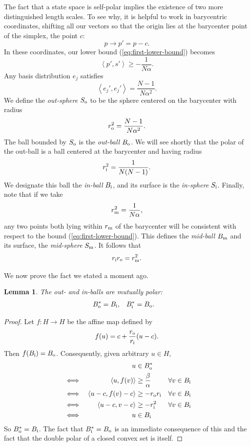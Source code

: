 \documentclass[aps,pra,superscriptaddress,10pt,tightenlines,twocolumn,nofootinbib]{revtex4}
\newtheorem{lemma}[theorem]{Lemma}
\theoremstyle{remark}
\newcommand{\be}{\begin{equation}}
\newcommand{\ee}{\end{equation}}
\newcommand{\ea}[1]{\begin{align}#1\end{align}}
\newcommand{\la}{\langle}
\newcommand{\ra}{\rangle}
\newcommand{\dl}[1]{#1^{*}}
\newcommand{\bo}{B_{\rm{o}}}
\newcommand{\bi}{B_{\rm{i}}}
\newcommand{\midball}{B_{\rm m}}
\newcommand{\midsphere}{S_{\rm m}}
\newcommand{\so}{S_{\rm{o}}}
\newcommand{\si}{S_{\rm{i}}}
\newcommand{\ro}{r_{\rm{o}}}
\newcommand{\ri}{r_{\rm{i}}}
\newcommand{\rmid}{r_{\rm m}}
\newcommand{\inprod}[2]{{\left\langle #1 , #2 \right\rangle}}
\begin{document}
The fact that a state space is self-polar implies the existence of two more distinguished length scales.  To see why, it is helpful to work in barycentric coordinates, shifting all our vectors so that the origin lies at the barycenter point of the simplex, the point $c$:
\be
p \to p' = p - c.
\ee
In these coordinates, our lower bound (\ref{eq:first-lower-bound}) becomes
\be
\inprod{p'}{s'} \geq - \frac{1}{N\alpha}.
\ee
Any basis distribution $e_j$ satisfies
\be
\inprod{e_j'}{e_j'} = \frac{N-1}{N\alpha^2}.
\ee
We define the \emph{out-sphere} $\so$ to be the sphere centered on the barycenter with radius
\be
\ro^2 = \frac{N-1}{N\alpha^2}.
\ee
The ball bounded by $\so$ is the \emph{out-ball} $\bo$.  We will see shortly that the polar of the out-ball is a ball centered at the barycenter and having radius
\be
\ri^2 = \frac{1}{N(N-1)}.
\ee
We designate this ball the \emph{in-ball} $\bi$, and its surface is the \emph{in-sphere} $\si$.  Finally, note that if we take
\be
\rmid^2 = \frac{1}{N\alpha},
\ee
any two points both lying within $\rmid$ of the barycenter will be consistent with respect to the bound (\ref{eq:first-lower-bound}).  This defines the \emph{mid-ball} $\midball$ and its surface, the \emph{mid-sphere} $\midsphere$.  It follows that
\be
\ri \ro = \rmid^2.
\ee

We now prove the fact we stated a moment ago.
\begin{lemma}
\label{lm:simpballpolars}
The out- and in-balls are mutually polar:
\ea{
\dl{\bo} &= \bi, & \dl{\bi} &= \bo.
}
\end{lemma}
\begin{proof}
Let $f\colon H\to H$ be the affine map defined by
\be
f(u) = c + \frac{\ro}{\ri} (u-c).
\ee
Then $f(\bi) = \bo$.  Consequently, given arbitrary $u\in H$,
\ea{
&   &u &\in \dl{\bo} &&
\\
&\iff &  \la u, f(v) \ra &\ge \frac{\beta}{\alpha} & \forall v& \in \bi
\\
&\iff & \la u-c, f(v)-c\ra &\ge -\ro \ri &\forall v& \in \bi
\\
&\iff & \la u-c , v-c\ra & \ge -\ri^2 &\forall v&\in \bi
\\
&\iff & u & \in \bi &&
}
So $\dl{\bo}=\bi$.  The fact that $\dl{\bi} = \bo$ is an immediate consequence of this and the fact that the double polar of a closed convex set is itself.
\end{proof}
\end{document}
